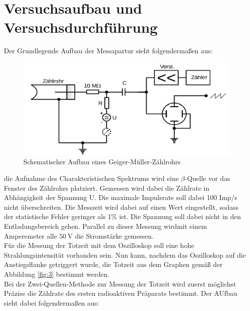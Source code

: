 
\section{Versuchsaufbau und Versuchsdurchführung}\justifying
Der Grundlegende Aufbau der Messapartur sieht folgendermaßen aus:
\begin{figure}[H]
    \centering
    \includegraphics[width=\linewidth]{images/aufbau.jpg}
    \caption{Schematischer Aufbau eines Geiger-Müller-Zählrohrs}
    \label{fig:5}
\end{figure}
\justifying die Aufnahme des Charakteristischen Spektrums wird eine $\beta$-Quelle vor das
Fenster des Zählrohrs platziert. Gemessen wird dabei die Zählrate in Abhängigkeit
der Spannung U. Die maximale Impulsrate soll dabei 100 Imp/s nicht überschreiten.
Die Messzeit wird dabei auf einen Wert eingestellt, sodass der statistische Fehler 
geringer als 1\% ist. Die Spannung soll dabei nicht in den Entladungsbereich gehen.
Parallel zu dieser Messung wirdmit einem Amperemeter alle $\SI{50}{\volt} $ die Stromstärke
gemessen.\\
Für die Messung der Totzeit mit dem Oszilloskop soll eine hohe Strahlungsintensität vorhanden sein.
Nun kann, nachdem das Oszilloskop auf die Anstiegsflanke getriggert wurde, die Totzeit
aus dem Graphen gemäß der Abbildung \ref{fig:3} bestimmt werden.\\
Bei der Zwei-Quellen-Methode zur Messung der Totzeit wird zuerst möglichst Präzise die Zählrate des
ersten radioaktiven Präparats bestimmt. Der AUfbau sieht dabei folgendermaßen aus:
